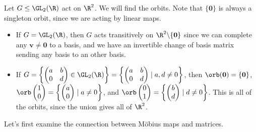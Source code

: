 \begin{example}
	Let $G \leq \GL_2(\R)$ act on $\R^2$. We will find the orbits. 
	Note that $\{\mathbf{0}\}$ is always a singleton orbit, since we are acting by linear maps.
	
\begin{itemize}
	\item If $G = \GL_2(\R)$, then $G$ acts transitively on $\R^2\backslash \{\mathbf{0}\}$ since we can complete any $\mathbf{v} \neq \mathbf{0}$ to a basis, and we have an invertible change of basis matrix sending any basis to an other basis.
	\item If $G = \left\{\begin{pmatrix}
		a & b \\ 0 & d
	\end{pmatrix} \in \GL_2(\R)\right\} =\left\{ \begin{pmatrix}
		a & b \\
		0 & d
	\end{pmatrix} \mid a, d \neq 0 \right\}$, then $\orb(\mathbf{0}) = \{\mathbf{0}\}$, $\orb\begin{pmatrix}
		1 \\ 0
	\end{pmatrix} = \left\{\begin{pmatrix}
		a \\ 0
	\end{pmatrix} \mid a \neq 0 \right\}$, and $\orb\begin{pmatrix}
		0 \\ 1
	\end{pmatrix} =\left \{\begin{pmatrix}
		b\\ d
	\end{pmatrix} \mid d \neq 0 \right\}$. This is all of the orbits, since the union gives all of $\R^2$.
\end{itemize}
\end{example}


Let's first examine the connection between Möbius maps and matrices.

